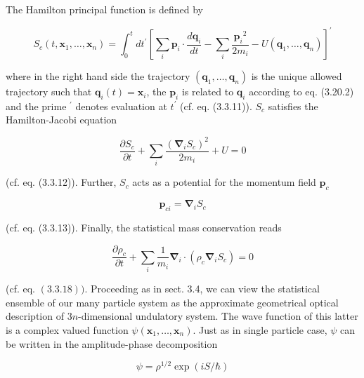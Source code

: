 \documentclass{article}
\begin{document}
The Hamilton principal function is defined by
 
\begin{equation*}
S_{c}\left(t, \boldsymbol{x}_{1}, \ldots, \boldsymbol{x}_{n}\right)=\int_{0}^{t} d t^{\prime}\left[\sum_{i} \boldsymbol{p}_{i} \cdot \frac{d \boldsymbol{q}_{i}}{d t}-\sum_{i} \frac{\boldsymbol{p}_{i}{ }^{2}}{2 m_{i}}-U\left(\boldsymbol{q}_{1}, \ldots, \boldsymbol{q}_{n}\right)\right]^{\prime} \tag{3.20.3}
\end{equation*}
 
where in the right hand side the trajectory $\left(\boldsymbol{q}_{1}, \ldots, \boldsymbol{q}_{n}\right)$ is the unique allowed trajectory such that $\boldsymbol{q}_{i}(t)=\boldsymbol{x}_{i}$, the $\boldsymbol{p}_{i}$ is related to $\boldsymbol{q}_{i}$ according to eq. (3.20.2) and the prime ${ }^{\prime}$ denotes evaluation at $t^{\prime}$ (cf. eq. (3.3.11)). $S_{c}$ satisfies the Hamilton-Jacobi equation
 
\begin{equation*}
\frac{\partial S_{c}}{\partial t}+\sum_{i} \frac{\left(\boldsymbol{\nabla}_{i} S_{c}\right)^{2}}{2 m_{i}}+U=0 \tag{3.20.4}
\end{equation*}
 
(cf. eq. (3.3.12)). Further, $S_{c}$ acts as a potential for the momentum field $\boldsymbol{p}_{c}$
 
\begin{equation*}
\boldsymbol{p}_{c i}=\boldsymbol{\nabla}_{i} S_{c} \tag{3.20.5}
\end{equation*}
 
(cf. eq. (3.3.13)). Finally, the statistical mass conservation reads
 
\begin{equation*}
\frac{\partial \rho_{c}}{\partial t}+\sum_{i} \frac{1}{m_{i}} \boldsymbol{\nabla}_{i} \cdot\left(\rho_{c} \boldsymbol{\nabla}_{i} S_{c}\right)=0 \tag{3.20.6}
\end{equation*}
 
(cf. eq. $(3.3 .18))$.
Proceeding as in sect. 3.4, we can view the statistical ensemble of our many particle system as the approximate geometrical optical description of $3 n$-dimensional undulatory system. The wave function of this latter is a complex valued function $\psi\left(\boldsymbol{x}_{1}, \ldots, \boldsymbol{x}_{n}\right)$. Just as in single particle case, $\psi$ can be written in the amplitude-phase decomposition
 
\begin{equation*}
\psi=\rho^{1 / 2} \exp (i S / \hbar) \tag{3.20.7}
\end{equation*}
 
\end{document}
